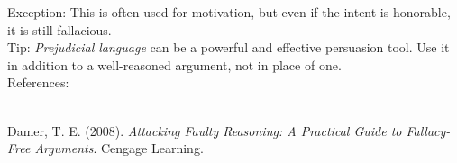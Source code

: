 \documentclass[a4paper,12pt,single,pdftex]{scrbook}
\begin{document}
    
      Exception: This is often used for motivation, but even if the intent is honorable, it is still fallacious.
    \\

    
      Tip: {\em Prejudicial language} can be a powerful and effective persuasion tool. Use it in addition to a well-reasoned argument, not in place of one.
    \\

    References:

    
      
        
      \\

      
        
          Damer, T. E. (2008). {\it Attacking Faulty Reasoning: A Practical Guide to Fallacy-Free Arguments}. Cengage Learning.
        
      
    
\end{document}
